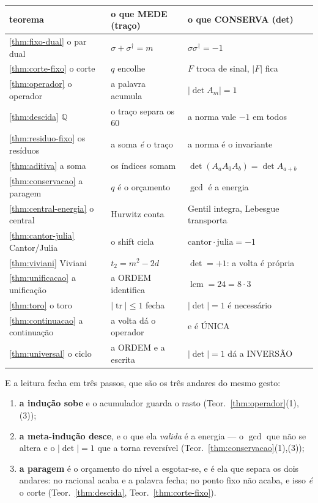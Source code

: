 \documentclass[11pt,a4paper]{article}
\newcommand{\abs}[1]{\lvert #1\rvert}
\newcommand{\dg}{^{\dagger}}
\begin{document}
\begin{center}\small
\begin{tabular}{@{}lll@{}}
\toprule
\textbf{teorema} & \textbf{o que MEDE (traço)} & \textbf{o que CONSERVA (det)}\\
\midrule
\ref{thm:fixo-dual} o par dual & $\sigma+\sigma\dg=m$ & $\sigma\sigma\dg=-1$\\
\ref{thm:corte-fixo} o corte & $q$ encolhe & $F$ troca de sinal, $\abs{F}$ fica\\
\ref{thm:operador} o operador & a palavra acumula & $\abs{\det A_m}=1$\\
\ref{thm:descida} $\mathbb{Q}$ & o traço separa os $60$ & a norma vale $-1$ em todos\\
\ref{thm:residuo-fixo} os resíduos & a soma \emph{é} o traço & a norma é o invariante\\
\ref{thm:aditiva} a soma & os índices somam & $\det(A_aA_0A_b)=\det A_{a+b}$\\
\ref{thm:conservacao} a paragem & $q$ é o orçamento & $\gcd$ é a energia\\
\ref{thm:central-energia} o central & Hurwitz conta & Gentil integra, Lebesgue transporta\\
\ref{thm:cantor-julia} Cantor/Julia & o shift cicla & $\mathrm{cantor}\cdot\mathrm{julia}=-1$\\
\ref{thm:viviani} Viviani & $t_2=m^{2}-2d$ & $\det=+1$: a volta é própria\\
\ref{thm:unificacao} a unificação & a ORDEM identifica & $\operatorname{lcm}=24=8\cdot3$\\
\ref{thm:toro} o toro & $\abs{\operatorname{tr}}\le1$ fecha & $\abs{\det}=1$ é necessário\\
\ref{thm:continuacao} a continuação & a volta dá o operador & e é ÚNICA\\
\ref{thm:universal} o ciclo & a ORDEM e a escrita & $\abs{\det}=1$ dá a INVERSÃO\\
\bottomrule
\end{tabular}
\end{center}

\noindent E a leitura fecha em três passos, que são os três andares do mesmo gesto:
\begin{enumerate}
\item \textbf{a indução sobe} e o acumulador guarda o rasto (Teor.~\ref{thm:operador}(1),(3));
\item \textbf{a meta-indução desce}, e o que ela \emph{valida} é a energia --- o
$\gcd$ que não se altera e o $\abs{\det}=1$ que a torna reversível
(Teor.~\ref{thm:conservacao}(1),(3));
\item \textbf{a paragem} é o orçamento do nível a esgotar-se, e é ela que separa os dois
andares: no racional acaba e a palavra fecha; no ponto fixo não acaba, e isso \emph{é} o
corte (Teor.~\ref{thm:descida}, Teor.~\ref{thm:corte-fixo}).
\end{enumerate}
\end{document}
